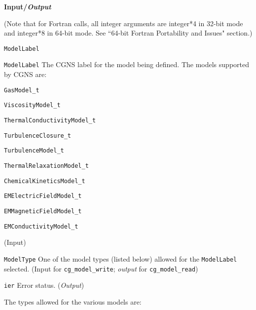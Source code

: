 \noindent
\textbf{\textcolor{input}{Input}/\textcolor{output}{\textit{Output}}}

\noindent (Note that for Fortran calls, all integer arguments are integer*4 in 32-bit mode and integer*8 in 64-bit mode.
See ``64-bit Fortran Portability and Issues" section.)

\begin{Ventryi}{\texttt{ModelLabel}}\raggedright
\item [\texttt{ModelLabel}]
      The CGNS label for the model being defined.
      The models supported by CGNS are:
      \begin{itemize*}
      \item \texttt{GasModel\_t}
      \item \texttt{ViscosityModel\_t}
      \item \texttt{ThermalConductivityModel\_t}
      \item \texttt{TurbulenceClosure\_t}
      \item \texttt{TurbulenceModel\_t}
      \item \texttt{ThermalRelaxationModel\_t}
      \item \texttt{ChemicalKineticsModel\_t}
      \item \texttt{EMElectricFieldModel\_t}
      \item \texttt{EMMagneticFieldModel\_t}
      \item \texttt{EMConductivityModel\_t}
      \end{itemize*}
      (\textcolor{input}{Input})
\item [\texttt{ModelType}]
      One of the model types (listed below) allowed for the
      \texttt{ModelLabel} selected.
      (\textcolor{input}{Input} for \texttt{cg\_model\_write};
      \textcolor{output}{\textit{output}} for \texttt{cg\_model\_read})
\item [\texttt{ier}]
      Error status.
      (\textcolor{output}{\textit{Output}})
\end{Ventryi}

\noindent
The types allowed for the various models are:

